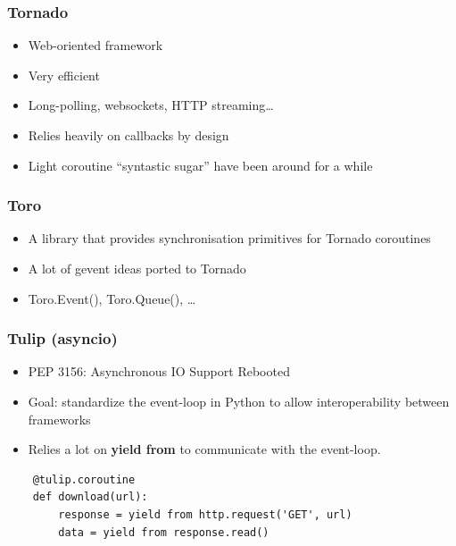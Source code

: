 \documentclass[ignorenonframetext,]{beamer}
\begin{document}
\begin{frame}[fragile]\frametitle{Tornado}

\begin{itemize}[<+->]
\itemsep1pt\parskip0pt
\item
  Web-oriented framework
\item
  Very efficient
\item
  Long-polling, websockets, HTTP streaming\ldots{}
\item
  Relies heavily on callbacks by design
\item
  Light coroutine ``syntastic sugar'' have been around for a while
\end{itemize}

\end{frame}

\begin{frame}[fragile]\frametitle{Toro}

\begin{itemize}[<+->]
\itemsep1pt\parskip0pt
\item
  A library that provides synchronisation primitives for Tornado
  coroutines
\item
  A lot of gevent ideas ported to Tornado
\item
  Toro.Event(), Toro.Queue(), \ldots{}
\end{itemize}

\end{frame}

\begin{frame}[fragile]\frametitle{Tulip (asyncio)}

\begin{itemize}[<+->]
\itemsep1pt\parskip0pt
\item
  PEP 3156: Asynchronous IO Support Rebooted
\item
  Goal: standardize the event-loop in Python to allow interoperability
  between frameworks
\item
  Relies a lot on \textbf{yield from} to communicate with the
  event-loop.
\end{itemize}

\begin{verbatim}
    @tulip.coroutine
    def download(url):
        response = yield from http.request('GET', url)
        data = yield from response.read()
\end{verbatim}

\end{frame}
\end{document}
